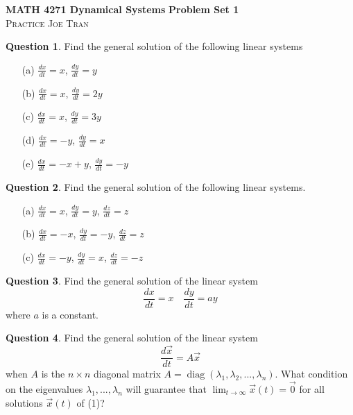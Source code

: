 \documentclass[11pt]{amsart}
\theoremstyle{definition}\newtheorem{definition}{Definition}
\theoremstyle{definition}\newtheorem{notation}{Notation}
\theoremstyle{definition}\newtheorem{example}{Example}
\theoremstyle{definition}\newtheorem{question}{Question}
\theoremstyle{theorem}\newtheorem{theorem}{Theorem}
\theoremstyle{theorem}\newtheorem{corollary}{Corollary}
\theoremstyle{theorem}\newtheorem{proposition}{Proposition}
\theoremstyle{theorem}\newtheorem{lemma}{Lemma}
\theoremstyle{remark}\newtheorem{remark}{Remark}
\DeclareMathOperator{\diag}{diag}
\begin{document}
\textbf{MATH 4271 Dynamical Systems} \hfill \textbf{Problem Set 1} \\
\textsc{Practice} \hfill \textsc{Joe Tran}

\begin{question}
    Find the general solution of the following linear systems
    \begin{itemize}
        \item[(a)] $\frac{dx}{dt} = x$, $\frac{dy}{dt} = y$
        \item[(b)] $\frac{dx}{dt} = x$, $\frac{dy}{dt} = 2y$
        \item[(c)] $\frac{dx}{dt} = x$, $\frac{dy}{dt} = 3y$
        \item[(d)] $\frac{dx}{dt} = -y$, $\frac{dy}{dt} = x$
        \item[(e)] $\frac{dx}{dt} = -x + y$, $\frac{dy}{dt} = -y$
    \end{itemize}
\end{question}

\begin{question}
    Find the general solution of the following linear systems.
    \begin{itemize}
        \item[(a)] $\frac{dx}{dt} = x$, $\frac{dy}{dt} = y$, $\frac{dz}{dt} = z$
        \item[(b)] $\frac{dx}{dt} = -x$, $\frac{dy}{dt} = -y$, $\frac{dz}{dt} = z$
        \item[(c)] $\frac{dx}{dt} = -y$, $\frac{dy}{dt} = x$, $\frac{dz}{dt} = -z$
    \end{itemize}
\end{question}

\begin{question}
    Find the general solution of the linear system
    \begin{equation*}
        \frac{dx}{dt} = x \quad \frac{dy}{dt} = ay
    \end{equation*}
    where $a$ is a constant.
\end{question}

\begin{question}
    Find the general solution of the linear system
    \begin{equation*}
        \frac{d\vec{x}}{dt} = A\vec{x} \tag{1}
    \end{equation*}
    when $A$ is the $n \times n$ diagonal matrix $A = \diag(\lambda_1, \lambda_2,..., \lambda_n)$. What condition on the eigenvalues $\lambda_1,..., \lambda_n$ will guarantee that $\lim_{t \to \infty} \vec{x}(t) = \vec{0}$ for all solutions $\vec{x}(t)$ of (1)?
\end{question}
\end{document}
